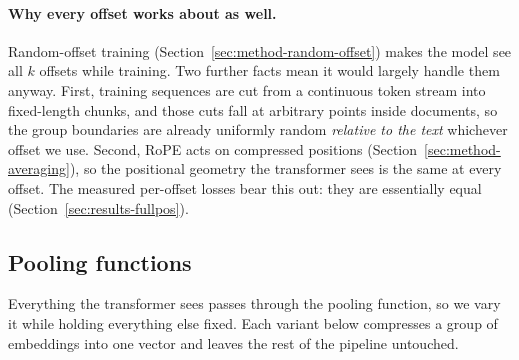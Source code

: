 \documentclass[11pt]{article}
\begin{document}
\paragraph{Why every offset works about as well.}
Random-offset training (Section~\ref{sec:method-random-offset}) makes the
model see all $k$ offsets while training. Two further facts mean it would
largely handle them anyway. First, training sequences are cut from a
continuous token stream into fixed-length chunks, and those cuts fall at
arbitrary points inside documents, so the group boundaries are already
uniformly random \emph{relative to the text} whichever offset we use. Second,
RoPE acts on compressed positions (Section~\ref{sec:method-averaging}), so the
positional geometry the transformer sees is the same at every offset. The
measured per-offset losses bear this out: they are essentially equal
(Section~\ref{sec:results-fullpos}).

\subsection{Pooling functions}
\label{sec:method-pooling}

Everything the transformer sees passes through the pooling function, so we
vary it while holding everything else fixed. Each variant below compresses a
group of embeddings into one vector and leaves the rest of the pipeline
untouched.
\end{document}
